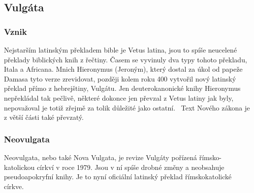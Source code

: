 \documentclass[letterpaper,12pt,oneside]{article}
\begin{document}
\subsection{Vulgáta}
\subsubsection{Vznik}
Nejstarším latinským překladem bible je Vetus latina, jsou to spíše neucelené překlady biblických knih z řečtiny. Časem se vyvinuly dva typy tohoto překladu, Itala a Africana. Mnich Hieronymus (Jeroným), který dostal za úkol od papeže Damasa tyto verze zrevidovat, později kolem roku 400 vytvořil nový latinský překlad přímo z hebrejštiny, Vulgátu. Jen deuterokanonické knihy Hieronymus nepřekládal tak pečlivě, některé dokonce jen převzal z Vetus latiny jak byly, nepovažoval je totiž zřejmě za tolik důležité jako ostatní.~\cite[strana 18-19]{cep}  Text Nového zákona je z větší části také převzatý.

\subsubsection{Neovulgata}
Neovulgata, nebo také Nova Vulgata, je revize Vulgáty pořízená římsko-katolickou církví v roce 1979. Jsou v ní spíše drobné změny a neobsahuje pseudoapokryfní knihy. Je to nyní oficiální latinský překlad římskokatolické církve.~\cite[strana 19]{cep}
\end{document}

